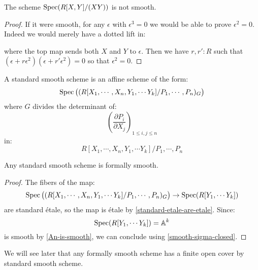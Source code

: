 \begin{lemma}
The scheme $\operatorname{Spec}(R[X,Y]/(XY))$ is not smooth.
\end{lemma}

\begin{proof}
If it were smooth, for any $\epsilon$ with $\epsilon^3=0$ we would be able to prove $\epsilon^2=0$.
Indeed we would merely have a dotted lift in:
 \begin{center}
    \end{center}
    where the top map sends both $X$ and $Y$ to $\epsilon$. Then we have $r,r':R$ such that $(\epsilon+r\epsilon^2)(\epsilon+r'\epsilon^2)=0$ so that $\epsilon^2=0$. %
\end{proof}

\begin{definition}
A standard smooth scheme is an affine scheme of the form:
\[\operatorname{Spec}\big((R[X_1,\cdots,X_n,Y_1,\cdots Y_{k}] / P_1,\cdots,P_n)_G\big)\]
where $G$ divides the determinant of:
\[\left( \frac{\partial P_i}{\partial X_j}\right)_{1\leq i,j\leq n}\]
in:
\[R[X_1,\cdots,X_n,Y_1,\cdots Y_{k}] / P_1,\cdots,P_n\]
\end{definition}

\begin{lemma}\label{standard-smooth-is-smooth}
Any standard smooth scheme is formally smooth.
\end{lemma}

\begin{proof}
The fibers of the map:
\[\operatorname{Spec}\big((R[X_1,\cdots,X_n,Y_1,\cdots Y_{k}] / P_1,\cdots,P_n)_G\big) \to \operatorname{Spec}(R[Y_1,\cdots Y_{k}])\]
are standard étale, so the map is étale by \cref{standard-etale-are-etale}. Since:
\[\operatorname{Spec}(R[Y_1,\cdots Y_{k}]) = \mathbb{A}^k\]
is smooth by \cref{An-is-smooth}, we can conclude using \cref{smooth-sigma-closed}.
\end{proof}

\begin{remark}
We will see later that any formally smooth scheme has a finite open cover by standard smooth scheme. 
\end{remark}



